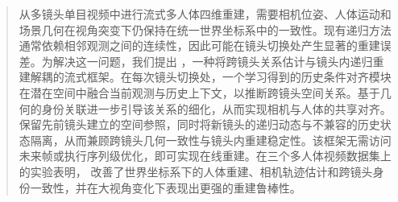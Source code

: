 \begin{abstract}
从多镜头单目视频中进行流式多人体四维重建，需要相机位姿、人体运动和场景几何在视角突变下仍保持在统一世界坐标系中的一致性。现有递归方法通常依赖相邻观测之间的连续性，因此可能在镜头切换处产生显著的重建误差。为解决这一问题，我们提出 \textbf{\method{}}，一种将跨镜头关系估计与镜头内递归重建解耦的流式框架。在每次镜头切换处，一个学习得到的历史条件对齐模块在潜在空间中融合当前观测与历史上下文，以推断跨镜头空间关系。基于几何的身份关联进一步引导该关系的细化，从而实现相机与人体的共享对齐。\method{} 保留先前镜头建立的空间参照，同时将新镜头的递归动态与不兼容的历史状态隔离，从而兼顾跨镜头几何一致性与镜头内重建稳定性。该框架无需访问未来帧或执行序列级优化，即可实现在线重建。在三个多人体视频数据集上的实验表明，\method{} 改善了世界坐标系下的人体重建、相机轨迹估计和跨镜头身份一致性，并在大视角变化下表现出更强的重建鲁棒性。
\end{abstract}
